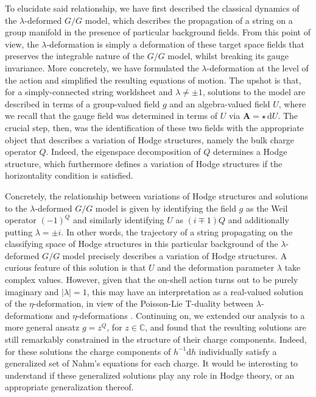 \documentclass[11pt,a4paper]{article}
\numberwithin{equation}{section}
\numberwithin{table}{section}\setlength{\multlinegap}{25pt}
\newcommand{\dd}{\mathrm{d}}
\begin{document}
To elucidate said relationship, we have first described the classical dynamics of the $\lambda$-deformed $G/G$ model, which describes the propagation of a string on a group manifold in the presence of particular background fields. From this point of view, the $\lambda$-deformation is simply a deformation of these target space fields that preserves the integrable nature of the $G/G$ model, whilst breaking its gauge invariance. More concretely, we have formulated the $\lambda$-deformation at the level of the action and simplified the resulting equations of motion. The upshot is that, for a simply-connected string worldsheet and $\lambda\neq \pm 1$, solutions to the model are described in terms of a group-valued field $g$ and an algebra-valued field $U$, where we recall that the gauge field was determined in terms of $U$ via $\mathbf{A}=\star\,\dd U$. The crucial step, then, was the identification of these two fields with the appropriate object that describes a variation of Hodge structures, namely the bulk charge operator $Q$. Indeed, the eigenspace decomposition of $Q$ determines a Hodge structure, which furthermore defines a variation of Hodge structures if the horizontality condition is satisfied.

Concretely, the relationship between variations of Hodge structures and solutions to the $\lambda$-deformed $G/G$ model is given by identifying the field $g$ as the Weil operator $(-1)^Q$ and similarly identifying $U$ as $(i\mp 1)Q$ and additionally putting $\lambda = \pm i$. In other words, the trajectory of a string propagating on the classifying space of Hodge structures in this particular background of the $\lambda$-deformed $G/G$ model precisely describes a variation of Hodge structures. A curious feature of this solution is that $U$ and the deformation parameter $\lambda$ take complex values. However, given that the on-shell action turns out to be purely imaginary and $|\lambda|=1$, this may have an interpretation as a real-valued solution of the $\eta$-deformation, in view of the Poisson-Lie T-duality between $\lambda$-deformations and $\eta$-deformations \cite{Klimcik_2015}. Continuing on, we extended our analysis to a more general ansatz $g=z^Q$, for $z\in\mathbb{C}$, and found that the resulting solutions are still remarkably constrained in the structure of their charge components. Indeed, for these solutions the charge components of $h^{-1}\dd h$ individually satisfy a generalized set of Nahm's equations for each charge. It would be interesting to understand if these generalized solutions play any role in Hodge theory, or an appropriate generalization thereof.  
 
\end{document}
